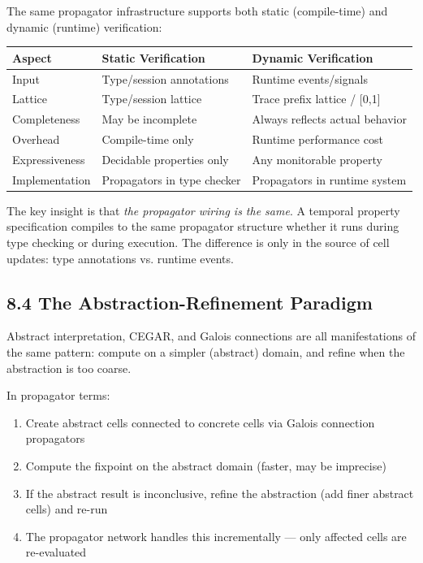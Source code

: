 \documentclass[11pt]{article}
\begin{document}
The same propagator infrastructure supports both static (compile-time) and
dynamic (runtime) verification:

\begin{center}
\begin{tabular}{lll}
Aspect & Static Verification & Dynamic Verification\\
\hline
Input & Type/session annotations & Runtime events/signals\\
Lattice & Type/session lattice & Trace prefix lattice / [0,1]\\
Completeness & May be incomplete & Always reflects actual behavior\\
Overhead & Compile-time only & Runtime performance cost\\
Expressiveness & Decidable properties only & Any monitorable property\\
Implementation & Propagators in type checker & Propagators in runtime system\\
\end{tabular}
\end{center}

The key insight is that \emph{the propagator wiring is the same}. A temporal
property specification compiles to the same propagator structure whether it
runs during type checking or during execution. The difference is only in
the source of cell updates: type annotations vs. runtime events.
\subsection{8.4 The Abstraction-Refinement Paradigm}
\label{sec:orgdd0b2ff}

Abstract interpretation, CEGAR, and Galois connections are all manifestations
of the same pattern: compute on a simpler (abstract) domain, and refine when
the abstraction is too coarse.

In propagator terms:
\begin{enumerate}
\item Create abstract cells connected to concrete cells via Galois connection
propagators
\item Compute the fixpoint on the abstract domain (faster, may be imprecise)
\item If the abstract result is inconclusive, refine the abstraction (add finer
abstract cells) and re-run
\item The propagator network handles this incrementally --- only affected cells
are re-evaluated
\end{enumerate}
\end{document}
